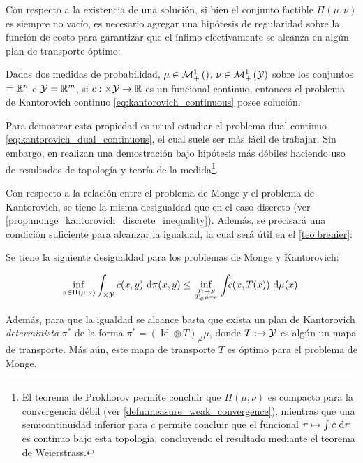 Con respecto a la existencia de una solución, si bien el conjunto factible $\Pi(\mu,\nu)$ es siempre no vacío, es necesario agregar una hipótesis de regularidad sobre la función de costo para garantizar que el ínfimo efectivamente se alcanza en algún plan de transporte óptimo:

\begin{prop}
	Dadas dos medidas de probabilidad, $\mu\in\mathcal{M}_+^1\left(\right)$, $\nu\in\mathcal{M}_+^1\left(\mathcal{Y}\right)$ sobre los conjuntos $=\mathbb{R}^n$ e $\mathcal{Y}=\mathbb{R}^m$, si $c:\times\mathcal{Y}\to\mathbb{R}$ es un funcional continuo, entonces el problema de Kantorovich continuo \eqref{eq:kantorovich_continuous} posee solución.
\end{prop}

Para demostrar esta propiedad es usual estudiar el problema dual continuo \eqref{eq:kantorovich_dual_continuous}, el cual suele ser más fácil de trabajar. Sin embargo, en \cite{villani2003topics} realizan una demostración bajo hipótesis más débiles haciendo uso de resultados de topología y teoría de la medida\footnote{El teorema de Prokhorov permite concluir que $\Pi(\mu,\nu)$ es compacto para la convergencia débil (ver \autoref{defn:measure_weak_convergence}), mientras que una semicontinuidad inferior para $c$ permite concluir que el funcional $\pi\mapsto \int c\,\operatorname{d}\!\pi$ es continuo bajo esta topología, concluyendo el resultado mediante el teorema de Weierstrass.}.

Con respecto a la relación entre el problema de Monge y el problema de Kantorovich, se tiene la misma desigualdad que en el caso discreto (ver \autoref{prop:monge_kantorovich_discrete_inequality}). Además, se precisará una condición suficiente para alcanzar la igualdad, la cual será útil en el \autoref{teo:brenier}:

\begin{prop}
	\label{prop:monge_kantorovich_ineq_continuous}
	Se tiene la siguiente desigualdad para los problemas de Monge y Kantorovich:

	\begin{equation*}
		\inf_{\pi \in \Pi(\mu,\nu)} \int_{\xspace\times\yspace} c(x, y) \d\pi(x, y) \leq
		\inf_{\feasible{T:\xspace\to\yspace}{T_\#\mu=\nu}}
		\int_{\xspace} c(x, T(x)) \d\mu(x).
	\end{equation*}

	Además, para que la igualdad se alcance basta que exista un plan de Kantorovich \textit{determinista} $\pi^*$ de la forma $\pi^* = (\operatorname{Id}\otimes T)_\#\mu$, donde $T:\to\mathcal{Y}$ es algún un mapa de transporte. Más aún, este mapa de transporte $T$ es óptimo para el problema de Monge.
\end{prop}

